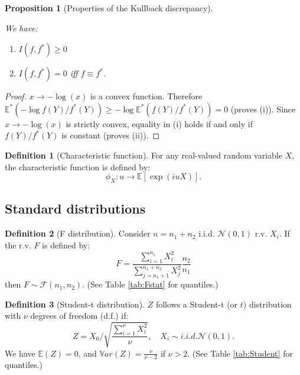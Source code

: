 \documentclass[
  12pt,
]{book}
\providecommand{\tightlist}{%
  \setlength{\itemsep}{0pt}\setlength{\parskip}{0pt}}
\newtheorem{proposition}{Proposition}[chapter]
\theoremstyle{definition}
\newtheorem{definition}{Definition}[chapter]
\theoremstyle{definition}
\theoremstyle{definition}
\theoremstyle{definition}
\theoremstyle{remark}
\begin{document}
\begin{proposition}[Properties of the Kullback discrepancy]
\protect\hypertarget{prp:Kullback}{}\label{prp:Kullback}

We have:

\begin{enumerate}
\def\labelenumi{\roman{enumi}.}
\tightlist
\item
  \(I(f,f^*) \ge 0\)
\item
  \(I(f,f^*) = 0\) iff \(f \equiv f^*\).
\end{enumerate}

\end{proposition}

\begin{proof}
\(x \rightarrow -\log(x)\) is a convex function. Therefore \(\mathbb{E}^*(-\log f(Y)/f^*(Y)) \ge -\log \mathbb{E}^*(f(Y)/f^*(Y)) = 0\) (proves (i)). Since \(x \rightarrow -\log(x)\) is strictly convex, equality in (i) holds if and only if \(f(Y)/f^*(Y)\) is constant (proves (ii)).
\end{proof}

\begin{definition}[Characteristic function]
\protect\hypertarget{def:characteristic}{}\label{def:characteristic}For any real-valued random variable \(X\), the characteristic function is defined by:
\[
\phi_X: u \rightarrow \mathbb{E}[\exp(iuX)].
\]
\end{definition}

\hypertarget{standard-distributions}{%
\subsection{Standard distributions}\label{standard-distributions}}

\begin{definition}[F distribution]
\protect\hypertarget{def:fstatistics}{}\label{def:fstatistics}Consider \(n=n_1+n_2\) i.i.d. \(\mathcal{N}(0,1)\) r.v. \(X_i\). If the r.v. \(F\) is defined by:
\[
F = \frac{\sum_{i=1}^{n_1} X_i^2}{\sum_{j=n_1+1}^{n_1+n_2} X_j^2}\frac{n_2}{n_1}
\]
then \(F \sim \mathcal{F}(n_1,n_2)\). (See Table \ref{tab:Fstat} for quantiles.)
\end{definition}

\begin{definition}[Student-t distribution]
\protect\hypertarget{def:tStudent}{}\label{def:tStudent}\(Z\) follows a Student-t (or \(t\)) distribution with \(\nu\) degrees of freedom (d.f.) if:
\[
Z = X_0 \bigg/ \sqrt{\frac{\sum_{i=1}^{\nu}X_i^2}{\nu}}, \quad X_i \sim i.i.d. \mathcal{N}(0,1).
\]
We have \(\mathbb{E}(Z)=0\), and \(\mathbb{V}ar(Z)=\frac{\nu}{\nu-2}\) if \(\nu>2\). (See Table \ref{tab:Student} for quantiles.)
\end{definition}
\end{document}
